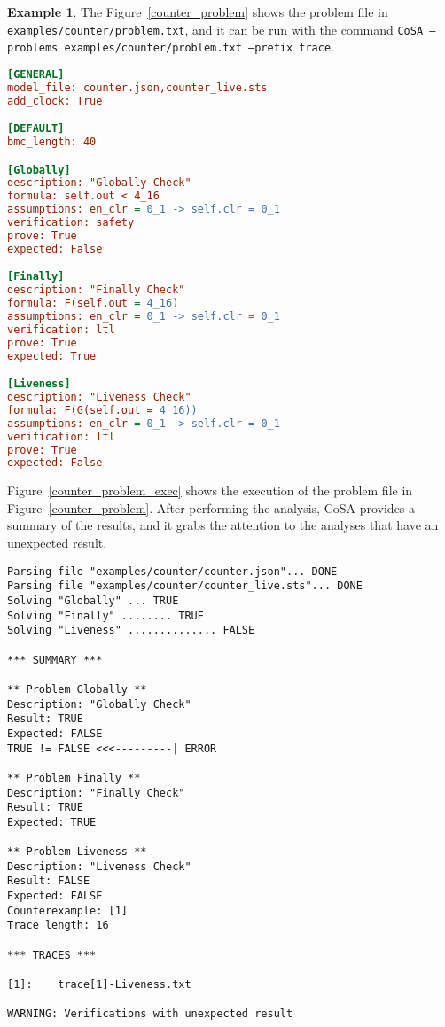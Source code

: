 \documentclass{article}
\theoremstyle{definition}
\newtheorem{example}{Example}[section]
\begin{document}
\begin{example}
The Figure~\ref{counter_problem} shows the problem file in
\texttt{examples/counter/problem.txt}, and it can be run with the
command \texttt{CoSA --problems examples/counter/problem.txt --prefix
  trace}.
  
\begin{lstlisting}[frame=single,language=Ini,caption=Problem file in \texttt{examples/counter/problem.txt},label=counter_problem]
[GENERAL]
model_file: counter.json,counter_live.sts
add_clock: True

[DEFAULT]
bmc_length: 40

[Globally]
description: "Globally Check"
formula: self.out < 4_16
assumptions: en_clr = 0_1 -> self.clr = 0_1
verification: safety
prove: True
expected: False

[Finally]
description: "Finally Check"
formula: F(self.out = 4_16)
assumptions: en_clr = 0_1 -> self.clr = 0_1
verification: ltl
prove: True
expected: True

[Liveness]
description: "Liveness Check"
formula: F(G(self.out = 4_16))
assumptions: en_clr = 0_1 -> self.clr = 0_1
verification: ltl
prove: True
expected: False
\end{lstlisting}

Figure~\ref{counter_problem_exec} shows the execution of the problem
file in Figure~\ref{counter_problem}. After performing the analysis,
CoSA provides a summary of the results, and it grabs the attention to
the analyses that have an unexpected result.

\begin{lstlisting}[frame=single,language=ets,caption=Analysis for the problem in Figure~\ref{counter_problem},label=counter_problem_exec]
Parsing file "examples/counter/counter.json"... DONE
Parsing file "examples/counter/counter_live.sts"... DONE
Solving "Globally" ... TRUE
Solving "Finally" ........ TRUE
Solving "Liveness" .............. FALSE

*** SUMMARY ***

** Problem Globally **
Description: "Globally Check"
Result: TRUE
Expected: FALSE
TRUE != FALSE <<<---------| ERROR

** Problem Finally **
Description: "Finally Check"
Result: TRUE
Expected: TRUE

** Problem Liveness **
Description: "Liveness Check"
Result: FALSE
Expected: FALSE
Counterexample: [1]
Trace length: 16

*** TRACES ***

[1]:	trace[1]-Liveness.txt

WARNING: Verifications with unexpected result
\end{lstlisting}

\end{example}
\end{document}
